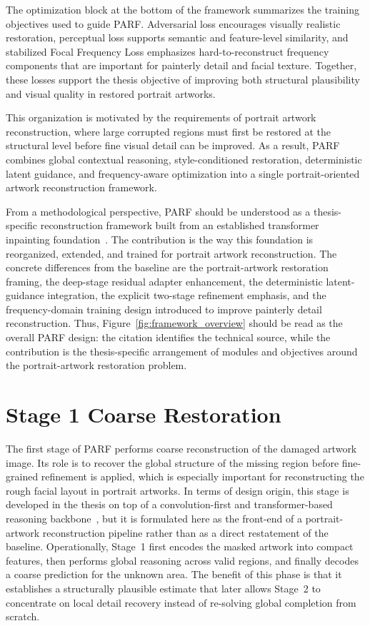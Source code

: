 \documentclass[12pt, twoside]{report}
\begin{document}
The optimization block at the bottom of the framework summarizes the training objectives used to guide PARF.
Adversarial loss encourages visually realistic restoration, perceptual loss supports semantic and feature-level similarity, and stabilized Focal Frequency Loss emphasizes hard-to-reconstruct frequency components that are important for painterly detail and facial texture.
Together, these losses support the thesis objective of improving both structural plausibility and visual quality in restored portrait artworks.

This organization is motivated by the requirements of portrait artwork reconstruction, where large corrupted regions must first be restored at the structural level before fine visual detail can be improved.
As a result, PARF combines global contextual reasoning, style-conditioned restoration, deterministic latent guidance, and frequency-aware optimization into a single portrait-oriented artwork reconstruction framework.

From a methodological perspective, PARF should be understood as a thesis-specific reconstruction framework built from an established transformer inpainting foundation~\cite{li2022mat}. The contribution is the way this foundation is reorganized, extended, and trained for portrait artwork reconstruction. The concrete differences from the baseline are the portrait-artwork restoration framing, the deep-stage residual adapter enhancement, the deterministic latent-guidance integration, the explicit two-stage refinement emphasis, and the frequency-domain training design introduced to improve painterly detail reconstruction. Thus, Figure~\ref{fig:framework_overview} should be read as the overall PARF design: the citation identifies the technical source, while the contribution is the thesis-specific arrangement of modules and objectives around the portrait-artwork restoration problem.

\section{Stage 1 Coarse Restoration}

The first stage of PARF performs coarse reconstruction of the damaged artwork image. Its role is to recover the global structure of the missing region before fine-grained refinement is applied, which is especially important for reconstructing the rough facial layout in portrait artworks. In terms of design origin, this stage is developed in the thesis on top of a convolution-first and transformer-based reasoning backbone~\cite{li2022mat}, but it is formulated here as the front-end of a portrait-artwork reconstruction pipeline rather than as a direct restatement of the baseline. Operationally, Stage~1 first encodes the masked artwork into compact features, then performs global reasoning across valid regions, and finally decodes a coarse prediction for the unknown area. The benefit of this phase is that it establishes a structurally plausible estimate that later allows Stage~2 to concentrate on local detail recovery instead of re-solving global completion from scratch.
\end{document}
